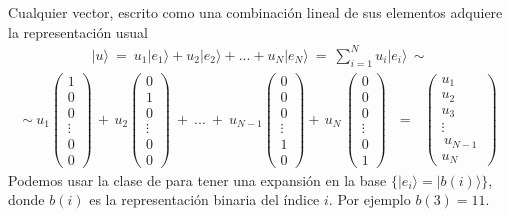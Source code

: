 \documentclass[letterpaper,10pt,english]{jupyterBook}
\newcommand{\ket}[1]{|#1\rangle}
\begin{document}
\sphinxAtStartPar
Cualquier vector, escrito como una combinación lineal de sus elementos adquiere la representación usual
\begin{equation*}
\begin{split}
|u\rangle ~=~ {u_1} |e_1 \rangle + {u_2} | e_2\rangle +... + {u_{ N}}|e_{ N}\rangle~=~ \sum_{i=1}^N {u_ i} |e_i\rangle \,\sim
\end{split}
\end{equation*}\begin{equation*}
\begin{split}
\sim~ {u_1} \begin{pmatrix} 1 \\ 0 \\ 0\\ \vdots 
\\ 0 \\ 0 \end{pmatrix} \,+\,{u_2} \begin{pmatrix} 0 \\ 1 \\ 0\\ \vdots \\ 0 \\ 0 \end{pmatrix}~+~ ... ~+ ~
{u_{N-1}} \begin{pmatrix} 0 \\ 0 \\ 0\\\vdots 
\\ 1 \\ 0 \end{pmatrix}+ 
\,{u_N}\,  \begin{pmatrix} 0 \\ 0 \\0\\ \vdots 
\\ 0 \\ 1 \end{pmatrix}~~~= ~~~
  \begin{pmatrix} {u_1} \\ {u_2} \\{u_3}\\ \vdots 
\\ \,{u_{N-1}}\, \\ {u_{N}} \end{pmatrix}
\end{split}
\end{equation*}
\sphinxAtStartPar
Podemos usar la clase  de  para tener una expansión en la base \(\{\ket{e_i}=\ket{b(i)}\}\), donde \(b(i)\) es la representación binaria del índice \(i\). Por ejemplo \(b(3) = 11\).
\end{document}
